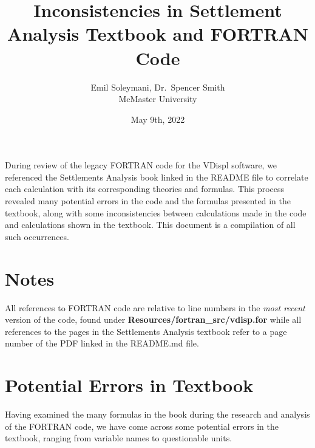 \documentclass[11pt,fleqn]{article}
\newcommand{\indentpar}{\phantom{=}}
\begin{document}
      
      \title{Inconsistencies in Settlement Analysis Textbook and FORTRAN Code}
      \date{May 9th, 2022}
      \author{Emil Soleymani, Dr.~Spencer Smith\\ McMaster University}
      \maketitle

      \medskip

      \indentpar During review of the legacy FORTRAN code for the VDispl software, 
      we referenced the Settlements Analysis book linked in the README 
      file to correlate each calculation with its corresponding 
      theories and formulas. This process revealed many potential errors 
      in the code and the formulas presented in the textbook, along with 
      some inconsistencies between calculations made in the code and 
      calculations shown in the textbook. This document is a compilation 
      of all such occurrences.
      
    
    \pagebreak
    

    \section*{Notes}
    \indentpar All references to FORTRAN code are relative to line numbers 
    in the \emph{most recent} version of the code, found under 
    \textbf{Resources/fortran\_src/vdisp.for} while all references to the pages
    in the Settlements Analysis textbook refer to a page number of the PDF linked 
    in the README.md file.

    
    \medskip

    \section*{Potential Errors in Textbook}

    \indentpar Having examined the many formulas in the book during the research and 
    analysis of the FORTRAN code, we have come across some potential errors in the
    textbook, ranging from variable names to questionable units.
   
\end{document}
